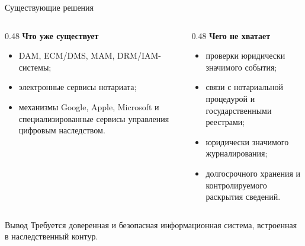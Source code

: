 \documentclass{beamer}
\newcommand{\smallitem}{\setlength{\itemsep}{0.35em}}
\begin{document}
\begin{frame}{Существующие решения}
  \footnotesize
  \begin{columns}[T,onlytextwidth]
    \begin{column}{0.48\linewidth}
      \textbf{Что уже существует}
      \begin{itemize}
        \smallitem
        \item DAM, ECM/DMS, MAM, DRM/IAM-системы;
        \item электронные сервисы нотариата;
        \item механизмы Google, Apple, Microsoft и специализированные сервисы управления цифровым наследством.
      \end{itemize}
    \end{column}
    \begin{column}{0.48\linewidth}
      \textbf{Чего не хватает}
      \begin{itemize}
        \smallitem
        \item проверки юридически значимого события;
        \item связи с нотариальной процедурой и государственными реестрами;
        \item юридически значимого журналирования;
        \item долгосрочного хранения и контролируемого раскрытия сведений.
      \end{itemize}
    \end{column}
  \end{columns}

  \vspace{0.2cm}
  \begin{block}{Вывод}
    Требуется доверенная и безопасная информационная система, встроенная в наследственный контур.
  \end{block}
\end{frame}
\end{document}
